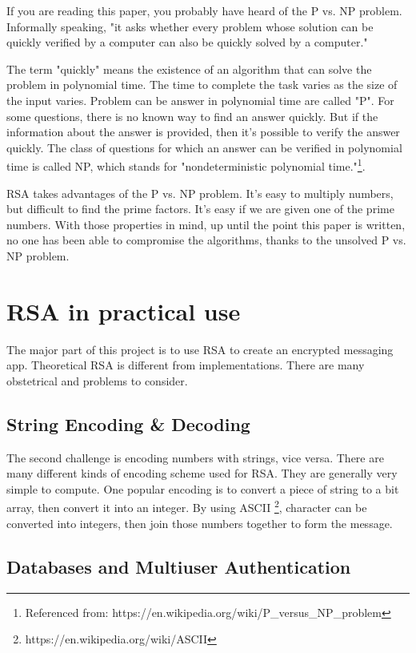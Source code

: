 \documentclass[]{article}
\begin{document}
If you are reading this paper, you probably have heard of the P vs. NP problem. Informally speaking, "it asks whether every problem whose solution can be quickly verified by a computer can also be quickly solved by a computer." 

The term "quickly" means the existence of an algorithm that can solve the problem in polynomial time. The time to complete the task varies as the size of the input varies. Problem can be answer in polynomial time are called "P". For some questions, there is no known way to find an answer quickly. But if the information about the answer is provided, then it's possible to verify the answer quickly. The class of questions for which an answer can be verified in polynomial time is called NP, which stands for "nondeterministic polynomial time."\footnote{Referenced from: https://en.wikipedia.org/wiki/P\_versus\_NP\_problem}.

RSA takes advantages of the P vs. NP problem. It's easy to multiply numbers, but difficult to find the prime factors. It's easy if we are given one of the prime numbers. With those properties in mind, up until the point this paper is written, no one has been able to compromise the algorithms, thanks to the unsolved P vs. NP problem. 

\section{RSA in practical use}

The major part of this project is to use RSA to create an encrypted messaging app. Theoretical RSA is different from implementations. There are many obstetrical and problems to consider. 

\subsection{String Encoding \&  Decoding}

The second challenge is encoding numbers with strings, vice versa. There are many different kinds of encoding scheme used for RSA. They are generally very simple to compute. One popular encoding is to convert a piece of string to a bit array, then convert it into an integer. By using ASCII \footnote{https://en.wikipedia.org/wiki/ASCII}, character can be converted into integers, then join those numbers together to form the message. 

\subsection{Databases and Multiuser Authentication}
\end{document}
